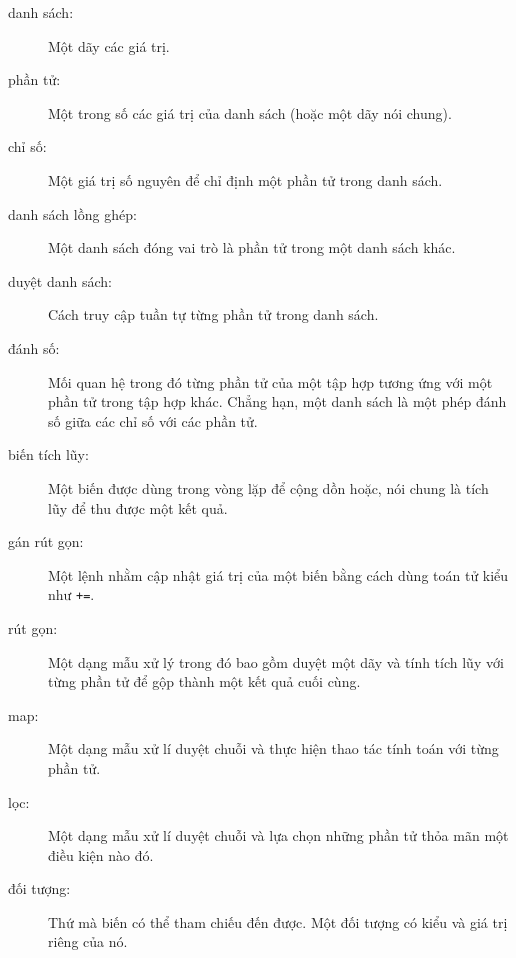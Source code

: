 \documentclass[11pt]{book}
\begin{document}
\begin{description}

\item[danh sách:] Một dãy các giá trị.

\item[phần tử:] Một trong số các giá trị của danh sách (hoặc một dãy
nói chung).

\item[chỉ số:] Một giá trị số nguyên để chỉ định một phần tử trong danh sách.

\item[danh sách lồng ghép:] Một danh sách đóng vai trò là phần tử trong một
danh sách khác.

\item[duyệt danh sách:] Cách truy cập tuần tự từng phần tử trong danh sách.

\item[đánh số:] Mối quan hệ trong đó từng phần tử của một tập hợp tương ứng
với một phần tử trong tập hợp khác. Chẳng hạn, một danh sách là một phép
đánh số giữa các chỉ số với các phần tử.

\item[biến tích lũy:] Một biến được dùng trong vòng lặp để cộng dồn
hoặc, nói chung là tích lũy để thu được một kết quả.

\item[gán rút gọn:] Một lệnh nhằm cập nhật giá trị của một biến bằng cách
dùng toán tử kiểu như \verb"+=".


\item[rút gọn:] Một dạng mẫu xử lý trong đó bao gồm duyệt một dãy và 
tính tích lũy với từng phần tử để gộp thành một kết quả cuối cùng.

\item[map:] Một dạng mẫu xử lí duyệt chuỗi và thực hiện thao tác 
tính toán với từng phần tử.

\item[lọc:] Một dạng mẫu xử lí duyệt chuỗi và lựa chọn những phần tử
thỏa mãn một điều kiện nào đó.

\item[đối tượng:] Thứ mà biến có thể tham chiếu đến được. Một đối tượng có
kiểu và giá trị riêng của nó.


\end{description}
\end{document}
